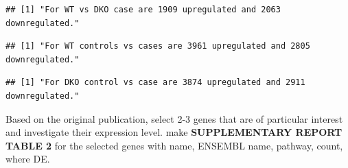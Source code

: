 \documentclass[
]{article}
\newenvironment{Shaded}{\begin{snugshade}}{\end{snugshade}}
\newcommand{\DecValTok}[1]{\textcolor[rgb]{0.00,0.00,0.81}{#1}}
\newcommand{\FunctionTok}[1]{\textcolor[rgb]{0.13,0.29,0.53}{\textbf{#1}}}
\newcommand{\NormalTok}[1]{#1}
\newcommand{\SpecialCharTok}[1]{\textcolor[rgb]{0.81,0.36,0.00}{\textbf{#1}}}
\newcommand{\StringTok}[1]{\textcolor[rgb]{0.31,0.60,0.02}{#1}}
\begin{document}
\begin{verbatim}
## [1] "For WT vs DKO case are 1909 upregulated and 2063 downregulated."
\end{verbatim}

\begin{Shaded}
\end{Shaded}

\begin{verbatim}
## [1] "For WT controls vs cases are 3961 upregulated and 2805 downregulated."
\end{verbatim}

\begin{Shaded}
\end{Shaded}

\begin{verbatim}
## [1] "For DKO control vs case are 3874 upregulated and 2911 downregulated."
\end{verbatim}

Based on the original publication, select 2-3 genes that are of
particular interest and investigate their expression level. make
\textbf{SUPPLEMENTARY REPORT TABLE 2} for the selected genes with name,
ENSEMBL name, pathway, count, where DE.
\end{document}
